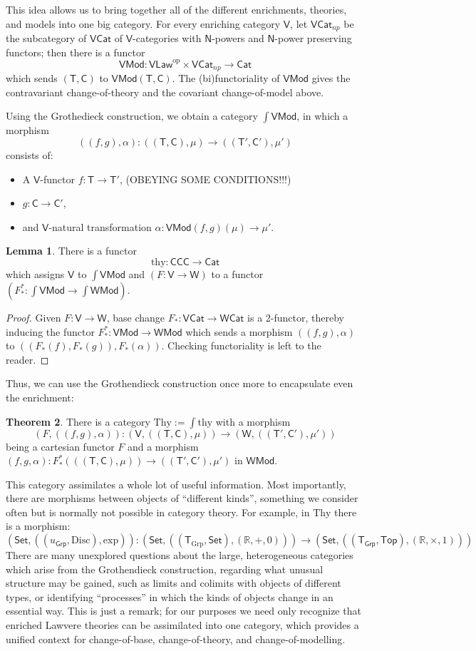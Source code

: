 \documentclass{amsart}
\theoremstyle{definition}
\newtheorem{theorem}{Theorem}
\newtheorem{lemma}[theorem]{Lemma}
\newcommand{\Set}{\mathsf{Set}}
\newcommand{\Grp}{\mathsf{Grp}}
\newcommand{\Cat}{\mathsf{Cat}}
\newcommand{\Law}{\mathsf{Law}}
\newcommand{\Top}{\mathsf{Top}}
\newcommand{\CCC}{\mathsf{CCC}}
\newcommand{\Mod}{\mathsf{Mod}}
\newcommand{\NN}{\mathsf{N}}
\newcommand{\V}{\mathsf{V}}
\newcommand{\W}{\mathsf{W}}
\newcommand{\C}{\mathsf{C}}
\newcommand{\T}{\mathsf{T}}
\newcommand{\op}{\mathrm{op}}
\newcommand{\maps}{\colon}
\begin{document}
This idea allows us to bring together all of the different enrichments, theories, and models into one big category. For every enriching category $\V$, let $\V\Cat_{np}$ be the subcategory of $\V\Cat$ of $\V$-categories with $\NN$-powers and $\NN$-power preserving functors; then there is a functor $$\V\Mod\maps \V\Law^\op \times \V\Cat_{np} \to \Cat$$ which sends $(\T,\C)$ to $\V\Mod(\T,\C)$. The (bi)functoriality of $\V\Mod$ gives the contravariant change-of-theory and the covariant change-of-model above.

Using the Grothedieck construction, we obtain a category \textbf{$\int \V\Mod$}, in which a morphism 
\[   ((f,g),\alpha)\maps ((\T,\C),\mu) \to ((\T',\C'),\mu') \]
consists of:
\begin{itemize}
\item
A $\V$-functor $f\maps\T\to \T'$, (OBEYING SOME CONDITIONS!!!)
\item
$g\maps\C\to \C'$, 
\item and $\V$-natural transformation $\alpha\maps\V\Mod(f,g)(\mu)\to \mu'$.
\end{itemize}

\begin{lemma}
	There is a functor $$\mathrm{thy}\maps \CCC \to \Cat$$ which assigns $\V$ to $\int \V\Mod$ and $(F\maps \V \to \W)$ to a functor $(F_*^*\maps \int \V\Mod \to \int \W\Mod)$.
\end{lemma}
\begin{proof}
	Given $F\maps\V\to \W$, base change $F_*\maps \V\Cat \to \W\Cat$ is a 2-functor, thereby inducing the functor $F_*^*\maps\V\Mod\to \W\Mod$ which sends a morphism $((f,g),\alpha)$ to $((F_*(f),F_*(g)),F_*(\alpha))$. Checking functoriality is left to the reader.
\end{proof}

Thus, we can use the Grothendieck construction once more to encapsulate even the enrichment:
\begin{theorem}
	There is a category $\mathrm{Thy} := \int \mathrm{thy}$ with a morphism $$(F,((f,g),\alpha))\maps (\V,((\T,\C),\mu)) \to (\W,((\T',\C'),\mu'))$$ being a cartesian functor $F$ and a morphism $(f,g,\alpha)\maps F_*^*(((\T,\C),\mu)) \to ((\T',\C'),\mu')$ in $\W\Mod$.
\end{theorem}

This category assimilates a whole lot of useful information. Most importantly, there are morphisms between objects of ``different kinds'', something we consider often but is normally not possible in category theory. For example, in $\mathrm{Thy}$ there is a morphism: 
\[ (\Set, ((u_{\Grp}, \mathrm{Disc}), \mathrm{exp}))\maps (\Set,((\T_{\mathrm{Grp}},\Set),(\mathbb{R},+,0))) \to (\Set,((\T_\Grp,\Top),(\mathbb{R},\times,1))) \]
There are many unexplored questions about the large, heterogeneous categories which arise from the Grothendieck construction, regarding what unusual structure may be gained, such as limits and colimits with objects of different types, or identifying ``processes'' in which the kinds of objects change in an essential way. This is just a remark; for our purposes we need only recognize that enriched Lawvere theories can be assimilated into one category, which provides a unified context for change-of-base, change-of-theory, and change-of-modelling.
\end{document}
